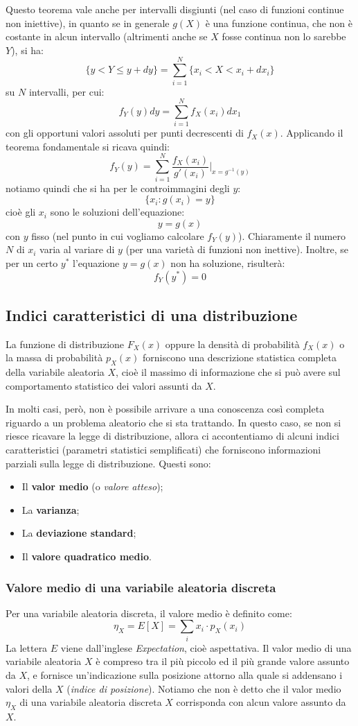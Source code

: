 \documentclass[a4paper,11pt]{article}
\begin{document}
Questo teorema vale anche per intervalli disgiunti (nel caso di funzioni continue non iniettive), in quanto se in generale $g(X)$ è una funzione continua, che non è costante in alcun intervallo (altrimenti anche se $X$ fosse continua non lo sarebbe $Y$), si ha:
$$
\{ y < Y \leq y + dy \} = \sum_{i = 1}^N \{ x_i < X < x_i + d x_i \}
$$
su $N$ intervalli, per cui:
$$
f_Y (y) dy = \sum_{i = 1}^N f_X (x_i) dx_1
$$
con gli opportuni valori assoluti per punti decrescenti di $f_X (x)$. Applicando il teorema fondamentale si ricava quindi:
$$
f_Y (y) = \sum_{i = 1}^N \frac{f_X (x_i)}{g'(x_i)} \Bigg|_{x = g^{-1}(y)} 
$$
notiamo quindi che si ha per le controimmagini degli $y$:
$$
\{x_i : g(x_i) = y\}
$$
cioè gli $x_i$ sono le soluzioni dell'equazione:
$$
y = g(x)
$$
con $y$ fisso (nel punto in cui vogliamo calcolare $f_Y (y)$). Chiaramente il numero $N$ di $x_i$ varia al variare di $y$ (per una varietà di funzioni non inettive). Inoltre, se per un certo $y^*$ l’equazione $y = g(x)$ non ha soluzione, risulterà:
$$
f_Y (y^*) = 0
$$

\subsection{Indici caratteristici di una distribuzione}
La funzione di distribuzione $F_X(x)$ oppure la densità di probabilità $f_X(x)$ o la massa di probabilità $p_X(x)$ forniscono una descrizione statistica completa della variabile aleatoria $X$, cioè il massimo di informazione che si può avere sul comportamento statistico dei valori assunti da $X$. 

In molti casi, però, non è possibile arrivare a una conoscenza così completa riguardo a un problema aleatorio che si sta trattando. In questo caso, se non si riesce ricavare la legge di distribuzione, allora ci accontentiamo di alcuni indici caratteristici (parametri statistici semplificati) che forniscono informazioni parziali sulla legge di distribuzione. Questi sono:
\begin{itemize}
	\item Il \textbf{valor medio} (o \textit{valore atteso});
	\item La \textbf{varianza};
	\item La \textbf{deviazione standard};
	\item Il \textbf{valore quadratico medio}.
\end{itemize}

\subsubsection{Valore medio di una variabile aleatoria discreta}
Per una variabile aleatoria discreta, il valore medio è definito come:
$$
\eta_X = E\left[X\right] = \sum_i x_i \cdot p_X (x_i)
$$
La lettera $E$ viene dall'inglese \textit{Expectation}, cioè aspettativa. Il valor medio di una variabile aleatoria $X$ è compreso tra il più piccolo ed il più grande valore assunto da $X$, e fornisce un’indicazione sulla posizione attorno alla quale si addensano i valori della $X$ (\textit{indice di posizione}). Notiamo che non è detto che il valor medio $\eta_X$ di una variabile aleatoria discreta $X$ corrisponda con alcun valore assunto da $X$.
\end{document}
